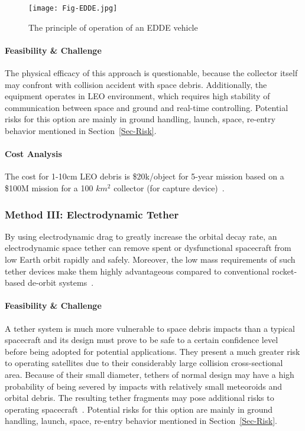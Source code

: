 \documentclass{mcmthesis}
\begin{document}
	\begin{figure}[htbp]
		\centering
		\texttt{[image: Fig-EDDE.jpg]}
		\caption{The principle of operation of an EDDE vehicle~\cite{Pearson2010}}
		\label{Fig-Edde}
	\end{figure}
	
	\paragraph{Feasibility \& Challenge}
	
	The physical efficacy of this approach is questionable, because the collector itself may confront with collision accident with space debris. Additionally, the equipment operates in LEO environment, which requires high stability of communication between space and ground and real-time controlling. Potential risks for this option are mainly in ground handling, launch, space, re-entry behavior mentioned in Section~\ref{Sec-Risk}.
	
	\paragraph{Cost Analysis}
	
	The cost for 1-10cm LEO debris is \$20k/object for 5-year mission based on a \$100M	mission for a 100 $km^2$ collector (for capture device)~\cite{McKnight}.
	
	
	\subsubsection{Method III: Electrodynamic Tether}
	
	By using electrodynamic drag to greatly increase the orbital decay rate, an electrodynamic space tether can remove spent or dysfunctional spacecraft from low Earth orbit rapidly and safely. Moreover, the low mass requirements of such tether devices make them highly advantageous compared to conventional rocket-based de-orbit systems~\cite{Pardini}.
	
	\paragraph{Feasibility \& Challenge}
	
	A tether system is much more vulnerable to space debris impacts than a typical spacecraft and its design must prove to be safe to a certain confidence level before being adopted for potential applications. They present a much greater risk to operating satellites due to their considerably large collision cross-sectional area. Because of their small diameter, tethers of normal design may have a high probability of being severed by impacts with relatively small meteoroids and orbital debris. The resulting tether fragments may pose additional risks to operating spacecraft~\cite{Pardini}. Potential risks for this option are mainly in ground handling, launch, space, re-entry behavior mentioned in Section~\ref{Sec-Risk}.
	
\end{document}

